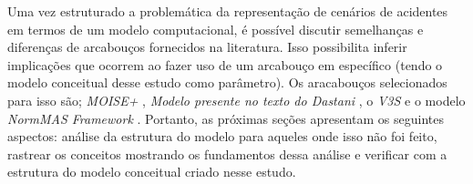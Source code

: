 Uma vez estruturado a problemática da representação de cenários de acidentes em termos de um modelo computacional, é possível discutir semelhanças e diferenças de arcabouços fornecidos na literatura. Isso possibilita inferir implicações que ocorrem ao fazer uso de um arcabouço em específico (tendo o modelo conceitual desse estudo como parâmetro). Os aracabouços selecionados para isso são; \textit{MOISE+} \cite{moiseframework}, 
\textit{Modelo presente no texto do Dastani} \cite{dastaniframework}, o \textit{V3S} \cite{v3sframework} e o modelo \textit{NormMAS Framework} \cite{normas}. 
Portanto, as próximas seções apresentam os seguintes aspectos: análise da estrutura do modelo para aqueles onde isso não foi feito, rastrear os conceitos mostrando os fundamentos dessa análise e verificar com a estrutura do modelo conceitual criado nesse estudo. 